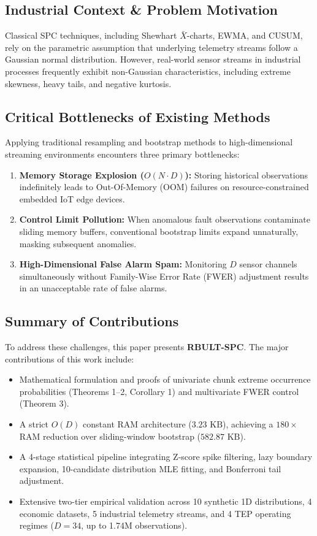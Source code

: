 \documentclass[a4paper,fleqn]{cas-sc}
\begin{document}
\subsection{Industrial Context \& Problem Motivation}
Classical SPC techniques, including Shewhart $\bar{X}$-charts, EWMA, and CUSUM, rely on the parametric assumption that underlying telemetry streams follow a Gaussian normal distribution. However, real-world sensor streams in industrial processes frequently exhibit non-Gaussian characteristics, including extreme skewness, heavy tails, and negative kurtosis.

\subsection{Critical Bottlenecks of Existing Methods}
Applying traditional resampling and bootstrap methods to high-dimensional streaming environments encounters three primary bottlenecks:
\begin{enumerate}
    \item \textbf{Memory Storage Explosion ($O(N \cdot D)$):} Storing historical observations indefinitely leads to Out-Of-Memory (OOM) failures on resource-constrained embedded IoT edge devices.
    \item \textbf{Control Limit Pollution:} When anomalous fault observations contaminate sliding memory buffers, conventional bootstrap limits expand unnaturally, masking subsequent anomalies.
    \item \textbf{High-Dimensional False Alarm Spam:} Monitoring $D$ sensor channels simultaneously without Family-Wise Error Rate (FWER) adjustment results in an unacceptable rate of false alarms.
\end{enumerate}

\subsection{Summary of Contributions}
To address these challenges, this paper presents \textbf{RBULT-SPC}. The major contributions of this work include:
\begin{itemize}
    \item Mathematical formulation and proofs of univariate chunk extreme occurrence probabilities (Theorems 1--2, Corollary 1) and multivariate FWER control (Theorem 3).
    \item A strict $O(D)$ constant RAM architecture ($3.23\text{ KB}$), achieving a $180\times$ RAM reduction over sliding-window bootstrap ($582.87\text{ KB}$).
    \item A 4-stage statistical pipeline integrating Z-score spike filtering, lazy boundary expansion, 10-candidate distribution MLE fitting, and Bonferroni tail adjustment.
    \item Extensive two-tier empirical validation across 10 synthetic 1D distributions, 4 economic datasets, 5 industrial telemetry streams, and 4 TEP operating regimes ($D=34$, up to 1.74M observations).
\end{itemize}
\end{document}
